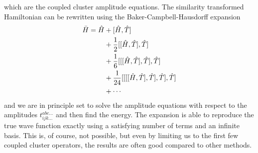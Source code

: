 which are the coupled cluster amplitude equations. The similarity transformed Hamiltonian can be rewritten using the Baker-Campbell-Hausdorff expansion
\begin{align}
\label{eq:BCH}
\bar{H} = \hat{H} &+ [\hat{H},\hat{T}]\notag \\
&+ \frac{1}{2}[[\hat{H},\hat{T}],\hat{T}]\notag \\
&+ \frac{1}{6}[[[\hat{H},\hat{T}],\hat{T}],\hat{T}] \\
&+ \frac{1}{24}[[[[\hat{H},\hat{T}],\hat{T}],\hat{T}],\hat{T}] \notag \\
&+ \cdots \notag
\end{align}
and we are in principle set to solve the amplitude equations with respect to the amplitudes $t_{ijk\hdots}^{abc\hdots}$ and then find the energy. The expansion is able to reproduce the true wave function exactly using a satisfying number of terms and an infinite basis. This is, of course, not possible, but even by limiting us to the first few coupled cluster operators, the results are often good compared to other methods. \cite{daniel_crawford_introduction_2007}
